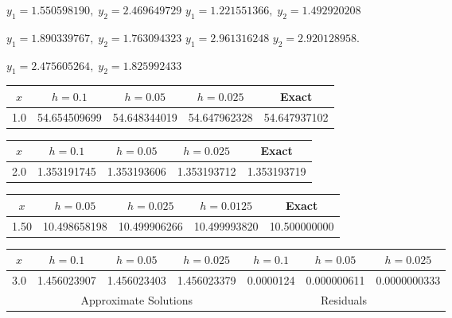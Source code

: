 \medskip

$y_{1}=1.550598190,\;y_{2}=2.469649729$
$y_{1}=1.221551366,\;y_{2}=1.492920208$

$y_{1}=1.890339767,\;y_{2}=1.763094323$
$ y_{1}=2.961316248$\; $ y_{2}=2.920128958$.

$y_{1}=2.475605264,\;y_{2}=1.825992433$

\medskip

{\small
\begin{tabular}{|c|r|r|r|r|}\hline
\multicolumn{1}{|c|}{$x$}&
\multicolumn{1}{|c|}{$h=0.1$}&
\multicolumn{1}{|c|}{$h=0.05$}&
\multicolumn{1}{|c|}{$h=0.025$}&
\multicolumn{1}{|c|}{Exact}\\ \hline
1.0 &  54.654509699 & 54.648344019 & 54.647962328 &  54.647937102 \\
\hline
\end{tabular}}\bigskip

{\small
\begin{tabular}{|c|r|r|r|r|}\hline
\multicolumn{1}{|c|}{$x$}&
\multicolumn{1}{|c|}{$h=0.1$}&
\multicolumn{1}{|c|}{$h=0.05$}&
\multicolumn{1}{|c|}{$h=0.025$}&
\multicolumn{1}{|c|}{Exact}\\ \hline
2.0 & 1.353191745 & 1.353193606 & 1.353193712 & 1.353193719\\
\hline
\end{tabular}}\bigskip

{\small
\begin{tabular}{|c|r|r|r|r|}\hline
\multicolumn{1}{|c|}{$x$}&
\multicolumn{1}{|c|}{$h=0.05$}&
\multicolumn{1}{|c|}{$h=0.025$}&
\multicolumn{1}{|c|}{$h=0.0125$}&
\multicolumn{1}{|c|}{Exact}\\ \hline
1.50 & 10.498658198 & 10.499906266 & 10.499993820 & 10.500000000 \\
\hline
\end{tabular}}\bigskip

{\small
\begin{tabular}{|c|r|r|r|r|r|r|}\hline
\multicolumn{1}{|c|}{$x$}&
\multicolumn{1}{|c|}{$h=0.1$}&
\multicolumn{1}{|c|}{$h=0.05$}&
\multicolumn{1}{|c|}{$h=0.025$}&
\multicolumn{1}{|c|}{$h=0.1$}&
\multicolumn{1}{|c|}{$h=0.05$}&
\multicolumn{1}{|c|}{$h=0.025$}\\ \hline
3.0 & 1.456023907 & 1.456023403 & 1.456023379 & 0.0000124 & 0.000000611 & 0.0000000333  \\
\hline
&\multicolumn{3}{c|}{Approximate Solutions}&
\multicolumn{3}{c|}{Residuals}\\\hline
\end{tabular}}\bigskip

